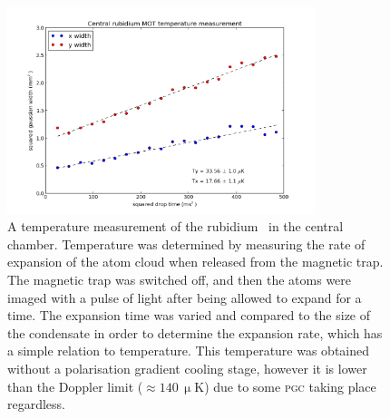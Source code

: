 \begin{figure}
\begin{center}
\includegraphics[width=0.8\textwidth]{figures/unsorted/temp.png}
\caption{\label{fig:temp} A temperature measurement of the rubidium \mot\ in the central chamber. Temperature was determined by measuring the rate of expansion of the atom cloud when released from the magnetic trap. The magnetic trap was switched off, and then the atoms were imaged with a pulse of light after being allowed to expand for a time. The expansion time was varied and compared to the size of the condensate in order to determine the expansion rate, which has a simple relation to temperature. This temperature was obtained without a polarisation gradient cooling stage, however it is lower than the Doppler limit ($\approx 140 \,\upmu$K) due to some \textsc{pgc} taking place regardless.}
\end{center}
\end{figure}

